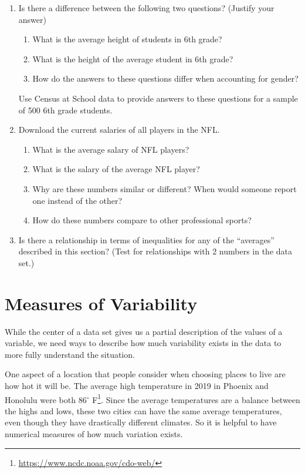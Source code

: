\documentclass[
]{book}
\providecommand{\tightlist}{%
  \setlength{\itemsep}{0pt}\setlength{\parskip}{0pt}}
\theoremstyle{definition}
\theoremstyle{definition}
\theoremstyle{definition}
\theoremstyle{definition}
\theoremstyle{remark}
\begin{document}
\begin{enumerate}
\def\labelenumi{\arabic{enumi}.}
\item
  Is there a difference between the following two questions? (Justify your answer)

  \begin{enumerate}
  \def\labelenumii{\alph{enumii}.}
  \tightlist
  \item
    What is the average height of students in 6th grade?
  \item
    What is the height of the average student in 6th grade?
  \item
    How do the answers to these questions differ when accounting for gender?
  \end{enumerate}

  Use Census at School data to provide answers to these questions for a sample of 500 6th grade students.
\item
  Download the current salaries of all players in the NFL.

  \begin{enumerate}
  \def\labelenumii{\alph{enumii}.}
  \tightlist
  \item
    What is the average salary of NFL players?
  \item
    What is the salary of the average NFL player?
  \item
    Why are these numbers similar or different? When would someone report one instead of the other?
  \item
    How do these numbers compare to other professional sports?
  \end{enumerate}
\item
  Is there a relationship in terms of inequalities for any of the ``averages'' described in this section? (Test for relationships with 2 numbers in the data set.)
\end{enumerate}

\hypertarget{measures-of-variability}{%
\section{Measures of Variability}\label{measures-of-variability}}

While the center of a data set gives us a partial description of the values of a variable, we need ways to describe how much variability exists in the data to more fully understand the situation.

One aspect of a location that people consider when choosing places to live are how hot it will be. The average high temperature in 2019 in Phoenix and Honolulu were both 86\(^\circ\) F\footnote{\url{https://www.ncdc.noaa.gov/cdo-web/}}.
Since the average temperatures are a balance between the highs and lows, these two cities can have the same average temperatures, even though they have drastically different climates. So it is helpful to have numerical measures of how much variation exists.
\end{document}
